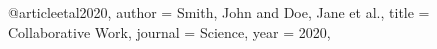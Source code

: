 @article{etal2020,
  author = {Smith, John and Doe, Jane et al.},
  title = {Collaborative Work},
  journal = {Science},
  year = {2020},
}

